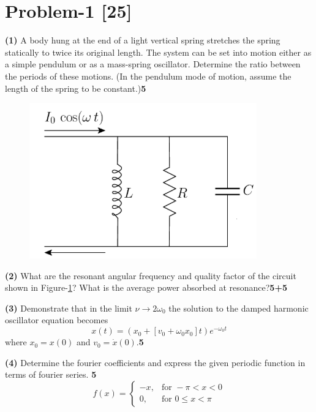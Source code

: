 \documentclass[12pt, a4paper]{article}
\begin{document}
\section*{Problem-1 \hfill \textbf{[25]}}
\noindent
\textbf{(1)} A body hung at the end of a light vertical spring stretches the spring statically to 
twice its original length. The system can be set into motion either as a simple pendulum or as a 
mass-spring oscillator. Determine the ratio between the periods of these motions. (In the pendulum 
mode of motion, assume the length of the spring to be constant.)\hfill\textbf{5}


\begin{figure}[h]
    \centering
    \includegraphics[scale=0.5]{figs/LCR-circuit.png}
    \caption{}
    \label{fig:LCR-circuit}
\end{figure}

\noindent
\textbf{(2)} What are the resonant angular frequency and quality factor of the circuit shown in 
Figure-\ref{fig:LCR-circuit}? What is the average power absorbed at resonance?\hfill\textbf{5+5}

\noindent
\textbf{(3)} Demonstrate that in the limit $\nu \rightarrow 2\omega_0$ the solution to the damped 
harmonic oscillator equation becomes
\begin{equation*}
    x(t) = (x_0 + [v_0+ \omega_0 x_0]t){e}^{-\omega_0 t}
\end{equation*}
where $x_0=x(0)$ and $v_0=\dot{x}(0)$.\hfill\textbf{5}

\noindent
\textbf{(4)} Determine the fourier coefficients and express the given periodic function in terms of 
fourier series. \hfill\textbf{5}
\[ f(x) =
\begin{cases} 
-x, & \text{for } -\pi< x < 0 \\
0, & \text{for } 0\leq x <\pi
\end{cases}
\] 
\end{document}

